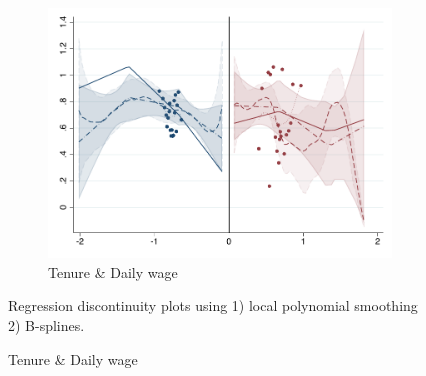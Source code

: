 \documentclass[oneside,11pt]{article}
\begin{document}
\begin{figure}[H]
\begin{center}
\begin{subfigure}{0.31\textwidth}
\caption{Tenure \& Daily wage}
        \includegraphics[width=\textwidth]{Figuras/rdplot_conflicto_arreglado_2_4_3.pdf}
    \end{subfigure}
  \end{center}
  
    \scriptsize Regression discontinuity plots using 1) local polynomial smoothing 2) B-splines.
\end{figure}

\clearpage
\end{document}
